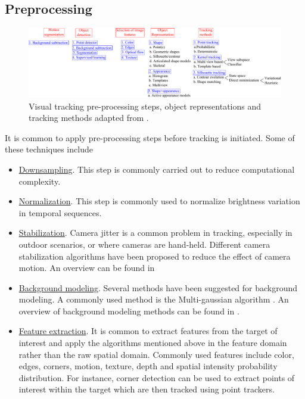 \subsection{Preprocessing}
\begin{figure}[t]
	\center
	\includegraphics[width=1.15\textwidth]{figs/TRK_overview.pdf}
	\caption{Visual tracking pre-processing steps, object representations and tracking methods adapted from \cite{2006_JNL_SURVEYtrk_Yilmaz}.}
	\label{TRK_overviewDiagram}
\end{figure}


It is common to apply pre-processing steps before tracking is initiated.  Some of these techniques include 

\begin{itemize}
\item \underline{Downsampling}.  This step is commonly carried out to reduce computational complexity.
\item \underline{Normalization}.  This step is commonly used to normalize brightness variation in temporal sequences.
\item \underline{Stabilization}.  Camera jitter is a common problem in tracking, especially in outdoor scenarios, or where cameras are hand-held.  Different camera stabilization algorithms have been proposed to reduce the effect of camera motion.  An overview can be found in \cite{2006_WHITE_stab_Sachs, 1999_JNL_stab_Engelsberg}
\item \underline{Background modeling}.  Several methods have been suggested for background modeling.  A commonly used method is the Multi-gaussian algorithm \cite{1999_CNF_RealTimeTracking_Stauffer}.  An overview of background modeling methods can be found in \cite{1999_CNF_Wallflower_Toyama}.
\item \underline{Feature extraction}.  It is common to extract features from the target of interest and apply the algorithms mentioned above in the feature domain rather than the raw spatial domain.  Commonly used features include color, edges, corners, motion, texture, depth and spatial intensity probability distribution.  For instance, corner detection \cite{1988_CNF_CombinedCornerEdgeDetector_Harris,2004_JNL_SIFT_Mikolajczyk} can be used to extract points of interest within the target which are then tracked using point trackers. 
\end{itemize}

